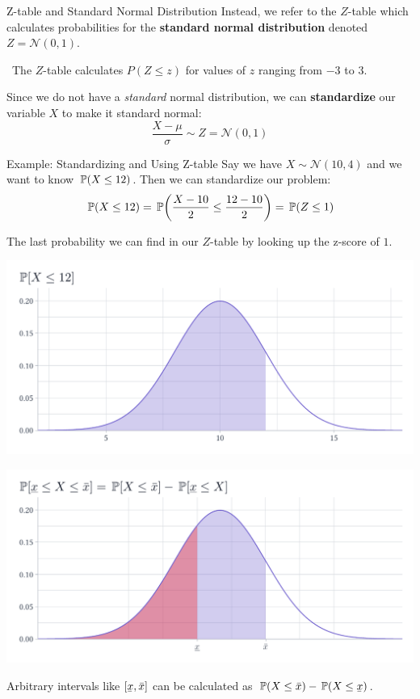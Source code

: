 \documentclass[aspectratio=169,t,11pt,table]{beamer}
\begin{document}
\begin{frame}{Z-table and Standard Normal Distribution}
  Instead, we refer to the $Z$-table which calculates probabilities for the \textbf{standard normal distribution} denoted $Z = \mathcal{N}(0, 1)$.
  
  \
  The $Z$-table calculates $P(Z \leq z)$ for values of $z$ ranging from $-3$ to $3$.

  \bigskip
  \pause
  Since we do not have a \emph{standard} normal distribution, we can \textbf{standardize} our variable $X$ to make it standard normal:
  $$
    \frac{X - \mu}{\sigma} \sim Z = \mathcal{N}(0, 1)
  $$
\end{frame}

\begin{frame}{Example: Standardizing and Using Z-table}
  Say we have $X \sim \mathcal{N}(10, 4)$ and we want to know $\prob{X \leq 12}$. Then we can standardize our problem:
  $$
    \prob{X \leq 12} = \prob{\frac{X - 10}{2} \leq \frac{12 - 10}{2}} = \prob{Z \leq 1} 
  $$
  
  \pause
  \bigskip
  The last probability we can find in our $Z$-table by looking up the z-score of $1$. 
\end{frame}

\begin{frame}
  \includegraphics[width = \textwidth]{figures/ex_probability_leq.pdf}
\end{frame}

\begin{frame}
  \includegraphics[width = \textwidth]{figures/ex_probability_between.pdf}

  Arbitrary intervals like $[\ubar{x}, \bar{x}]$ can be calculated as $\prob{X \leq \bar{x}} - \prob{X \leq \ubar{x}}$.
\end{frame}
\end{document}

